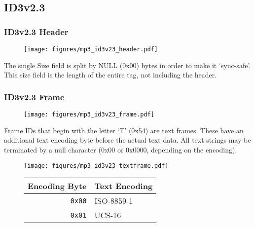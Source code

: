 \pagebreak

\subsection{ID3v2.3}
\subsubsection{ID3v2.3 Header}
\begin{figure}[h]
\texttt{[image: figures/mp3\_id3v23\_header.pdf]}
\end{figure}
\par
\noindent
The single Size field is split by NULL (0x00) bytes in order to make
it `sync-safe'.
This size field is the length of the entire tag, not including the header.

\subsubsection{ID3v2.3 Frame}
\begin{figure}[h]
\texttt{[image: figures/mp3\_id3v23\_frame.pdf]}
\end{figure}
\par
\noindent
Frame IDs that begin with the letter `T' (0x54) are text frames.
These have an additional text encoding byte before the actual
text data.
All text strings may be terminated by a null character
(0x00 or 0x0000, depending on the encoding).
\begin{figure}[h]
\texttt{[image: figures/mp3\_id3v23\_textframe.pdf]}
\begin{tabular}{r|l}
Encoding Byte & Text Encoding \\
\hline
\texttt{0x00} & ISO-8859-1 \\
\texttt{0x01} & UCS-16 \\
\end{tabular}
\end{figure}

\pagebreak

